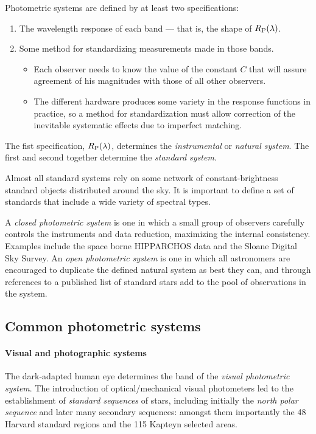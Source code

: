 Photometric systems are defined by at least two specifications:
\begin{enumerate}
\item The wavelength response of each band --- that is, the shape of
  $R_{\rm P}(\lambda)$.
\item Some method for standardizing measurements made in those bands. 
\begin{itemize}
\item Each observer needs to know the value of the constant $C$ that
  will assure agreement of his magnitudes with those of all other
  observers.
\item The different hardware produces some variety in the response
  functions in practice, so a method for standardization must allow
  correction of the inevitable systematic effects due to imperfect matching.
\end{itemize}
\end{enumerate}

The fist specification, $R_{\rm P}(\lambda)$, determines the
{\it instrumental} or {\it natural system}. The first and second
together determine the {\it standard system}. 

Almost all standard systems rely on some network of
constant-brightness standard objects distributed around the sky. It is
important to define a set of standards that include a wide variety of
spectral types.

A {\it closed photometric system} is one in which a small group of
observers carefully controls the instruments and data reduction,
maximizing the internal consistency. Examples include the space borne
HIPPARCHOS data and the Sloane Digital Sky Survey. An {\it open
  photometric system}  is one in which all astronomers are encouraged
to duplicate the defined natural system as best they can, and through
references to a published list of standard stars add to the pool of
observations in the system.

\subsection{Common photometric systems}

\paragraph{Visual and photographic systems} The dark-adapted human eye
determines the band of the {\it visual photometric system}. The
introduction of optical/mechanical visual photometers led to the
establishment of {\it standard sequences} of stars, including
initially the {\it north polar sequence} and later many secondary
sequences: amongst them importantly the 48 Harvard standard regions and the 115 Kapteyn
selected areas.

